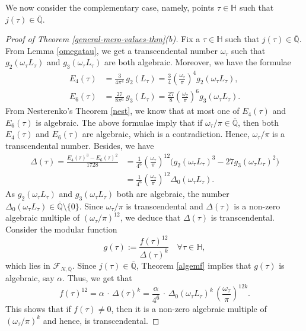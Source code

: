 \documentclass[11pt, reqno]{amsart}
\begin{document}
\noindent We now consider the complementary case, namely, points $\tau\in\mathbb{H}$ such that $j(\tau)\in\overline{\mathbb{Q}}$. 
\begin{proof}[Proof of Theorem \ref{general-mero-values-thm}(b)]
Fix a $\tau\in\mathbb{H}$ such that $j(\tau)\in\overline{\mathbb{Q}}$. From Lemma \ref{omegatau}, we get a transcendental number $\omega_\tau$ such that $g_2(\omega_\tau L_\tau)$ and $g_3(\omega_\tau L_\tau)$ are both algebraic. Moreover, we have the formulae
$$
\begin{aligned}
E_4(\tau)&=\frac{3}{4\pi^4}\, g_2(L_\tau)=\frac{3}{4}\left(\frac{\omega_\tau}{\pi} \right)^4 g_2(\omega_\tau L_\tau),\\ E_6(\tau)&=\frac{27}{8\pi^6}\,g_3(L_\tau)=\frac{27}{8}\left(\frac{\omega_\tau}{\pi}\right)^6g_3(\omega_\tau L_\tau).
\end{aligned}
$$
From Nesterenko's Theorem \ref{nest}, we know that at most one of $E_4(\tau)$ and $E_6(\tau)$ is algebraic. The above formulae imply that if ${\omega_{\tau}}/{\pi}\in\overline{\mathbb{Q}}$, then both $E_4(\tau)$ and $E_6(\tau)$ are algebraic, which is a contradiction. Hence, ${\omega_\tau}/{\pi}$ is a transcendental number. Besides, we have 
$$
\begin{aligned}
\Delta(\tau)=\frac{E_4(\tau)^3-E_6(\tau)^2}{1728}&=\frac{1}{4^6}\left(\frac{\omega_\tau}{\pi}\right)^{12}\bigg( g_2(\omega_\tau L_\tau)^3-27 g_3(\omega_\tau L_\tau)^2 \bigg)\\
&=\frac{1}{4^6}\left(\frac{\omega_\tau}{\pi}\right)^{12}\Delta_0(\omega_\tau L_\tau).  
\end{aligned}
$$
As $g_2(\omega_\tau L_\tau)$ and $g_3(\omega_\tau L_\tau)$ both are algebraic, the number $\Delta_0(\omega_\tau L_\tau)\in\overline{\mathbb{Q}}\setminus \{0\}$. Since ${\omega_\tau}/{\pi}$ is transcendental and $\Delta(\tau)$ is a non-zero algebraic multiple of $\left({\omega_\tau}/{\pi}\right)^{12}$, we deduce that $\Delta(\tau)$ is transcendental. \\

Consider the modular function $$g(\tau):=\frac{f(\tau)^{12}}{\Delta(\tau)^k}\quad \forall \tau\in\mathbb{H},$$ which lies in $ \mathcal{F}_{N,\overline{\mathbb{Q}}}$. Since $j(\tau)\in\overline{\mathbb{Q}}$, Theorem \ref{algemf} implies that $g(\tau)$ is algebraic, say $\alpha$. Thus, we get that
\begin{equation}\label{forms-value-j-alg}
f(\tau)^{12}= \alpha \, \cdot \, \Delta(\tau)^k=\frac{\alpha }{4^6} \, \cdot \, \Delta_0(\omega_\tau L_\tau)^k \, \left(\frac{\omega_\tau}{\pi} \right)^{12 k}. 
\end{equation}
This shows that if $f(\tau) \neq 0$, 
 then it is a non-zero algebraic multiple of $\left({\omega_\tau}/{\pi} \right)^{k}$ and hence, is transcendental.
\end{proof}
\bigskip
\end{document}

